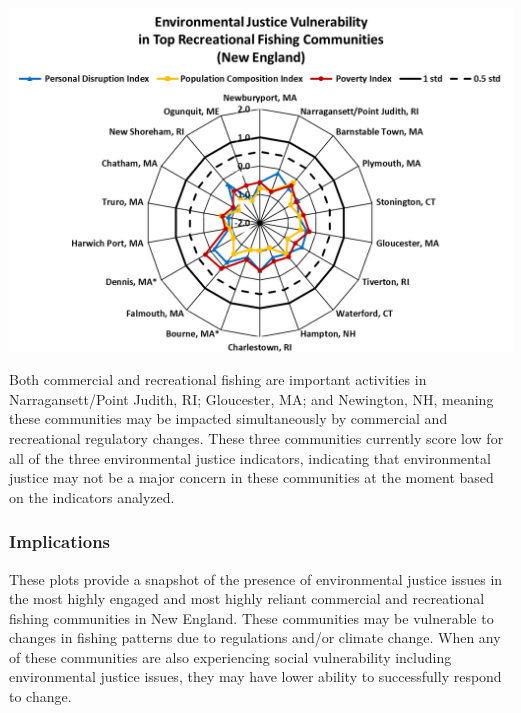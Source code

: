 \documentclass[
  10pt,
]{article}
\let\origfigure\figure
\let\endorigfigure\endfigure
\renewenvironment{figure}[1][2] {
    \expandafter\origfigure\expandafter[H]
} {
    \endorigfigure
}
\begin{document}
\begin{figure}

{\centering \includegraphics[width=0.8\linewidth]{SOE-NEFMC_files/figure-latex/recreational-EJ-1} 

}

\caption{Environmental justice indicators (Poverty Index, population composition index, and personal disruption index) for top recreational fishing communities in New England. *Community scored high (1.00 and above) for both commercial engagement and reliance indicators.}\label{fig:recreational-EJ}
\end{figure}

Both commercial and recreational fishing are important activities in Narragansett/Point Judith, RI; Gloucester, MA; and Newington, NH, meaning these communities may be impacted simultaneously by commercial and recreational regulatory changes. These three communities currently score low for all of the three environmental justice indicators, indicating that environmental justice may not be a major concern in these communities at the moment based on the indicators analyzed.

\hypertarget{implications-4}{%
\subsubsection{Implications}\label{implications-4}}

These plots provide a snapshot of the presence of environmental justice issues in the most highly engaged and most highly reliant commercial and recreational fishing communities in New England. These communities may be vulnerable to changes in fishing patterns due to regulations and/or climate change. When any of these communities are also experiencing social vulnerability including environmental justice issues, they may have lower ability to successfully respond to change.
\end{document}
